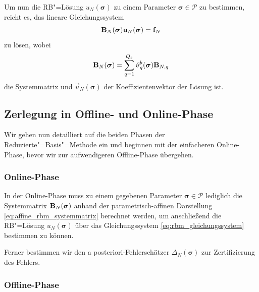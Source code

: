 \documentclass[../main.tex]{subfiles}
\begin{document}
Um nun die RB"=Lösung $u_{N}(\bm \sigma)$ zu einem Parameter $\bm \sigma \in \mathcal P$ zu bestimmen, reicht es, das lineare Gleichungssystem
\begin{equation}
\label{eq:rbm_gleichungssystem}
    \mathbf{B}_{N}(\bm \sigma) \mathbf{u}_{N}(\bm \sigma) = \mathbf{f}_{N}
\end{equation}
zu lösen, wobei
\begin{equation}
\label{eq:affine_rbm_systemmatrix}
    \mathbf{B}_{N}(\bm \sigma) = \sum_{q = 1}^{Q_b} \vartheta_{q}^{b}(\bm \sigma) \mathbf{B}_{N, q}
\end{equation}
die Systemmatrix und $\vec{u}_{N}(\bm \sigma)$ der Koeffizientenvektor der Lösung ist.

\subsection{Zerlegung in Offline- und Online-Phase} %
\label{sub:zerlegung_in_offline_und_online_phase}

Wir gehen nun detailliert auf die beiden Phasen der Reduzierte"=Basis"=Methode ein und beginnen mit der einfacheren Online-Phase, bevor wir zur aufwendigeren Offline-Phase übergehen.

\subsubsection{Online-Phase} %
\label{ssub:online_phase}

In der Online-Phase muss zu einem gegebenen Parameter $\bm \sigma \in \mathcal P$ lediglich die Systemmatrix $\mathbf{B}_{N}(\bm \sigma)$ anhand der parametrisch-affinen Darstellung \cref{eq:affine_rbm_systemmatrix} berechnet werden, um anschließend die RB"=Lösung $u_{N}(\bm \sigma)$ über das Gleichungssystem \cref{eq:rbm_gleichungssystem} bestimmen zu können.

Ferner bestimmen wir den a posteriori-Fehlerschätzer $\Delta_{N}(\bm \sigma)$ zur Zertifizierung des Fehlers.


\subsubsection{Offline-Phase} %
\label{ssub:offline_phase}



\end{document}
